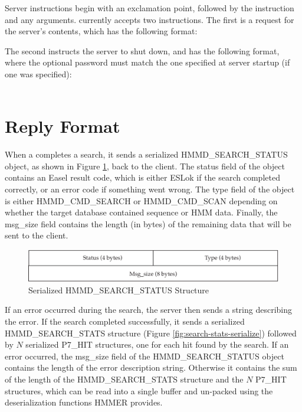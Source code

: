 \documentclass[notoc,justified,openany]{tufte-book}    %
\newcommand{\hmmserver}{\mono{hmmserver}\xspace}
\newcommand{\Hmmserver}{\mono{Hmmserver}\xspace}
\begin{document}
Server instructions begin with an exclamation point, followed by the instruction and any arguments.  \Hmmserver currently accepts two instructions.  The first is a request for the server's contents, which has the following format:
\vspace{1ex}
\\
\vspace{1ex}

The second instructs the server to shut down, and has the following format, where the optional password must match the one specified at server startup (if one was specified):\\
\vspace{1ex}
\\
\vspace{1ex}

\section{Reply Format}
When a \hmmserver completes a search, it sends a serialized {HMMD\_SEARCH\_STATUS} object, as shown in Figure \ref{fig:search-status-serialize}, back to the client.  The status field of the object contains an Easel result code, which is either {ESLok} if the search completed correctly, or an error code if something went wrong.  The type field of the object is either {HMMD\_CMD\_SEARCH} or {HMMD\_CMD\_SCAN} depending on whether the target database contained sequence or HMM data.  Finally, the msg\_size field contains the length (in bytes) of the remaining data that will be sent to the client.

  \begin{figure}
    \includegraphics[width=\textwidth]{inclusions/HMMD_SEARCH_STATUS.pdf}
    \caption{Serialized {HMMD\_SEARCH\_STATUS} Structure}
    \label{fig:search-status-serialize}
    \end{figure} 

If an error occurred during the search, the server then sends a string describing the error.  If the search completed successfully, it sends a serialized {HMMD\_SEARCH\_STATS} structure (Figure \ref{fig:search-stats-serialize}) followed by $N$ serialized {P7\_HIT} structures, one for each hit found by the search.  If an error occurred, the msg\_size field of the {HMMD\_SEARCH\_STATUS} object contains the length of the error description string.  Otherwise it contains the sum of the length of the {HMMD\_SEARCH\_STATS} structure and the $N$ {P7\_HIT} structures, which can be read into a single buffer and un-packed using the deserialization functions HMMER provides.
\end{document}
